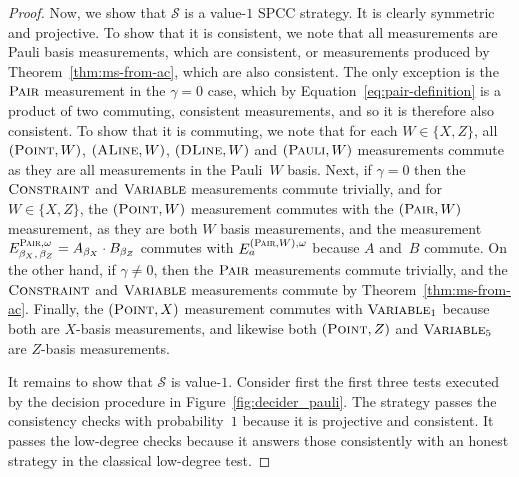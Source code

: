 \documentclass[11pt]{article}
\theoremstyle{definition}
\newcommand{\strategy}{\mathscr{S}}
\newcommand{\typestyle}[1]{\ensuremath{\textsc{#1}}\xspace}
\newcommand{\Point}{\typestyle{Point}}
\newcommand{\ALine}{\typestyle{ALine}}
\newcommand{\DLine}{\typestyle{DLine}}
\newcommand{\Pair}{\typestyle{Pair}}
\newcommand{\Constraint}{\typestyle{Constraint}}
\newcommand{\Variable}{\typestyle{Variable}}
\newcommand{\Pauli}{\typestyle{Pauli}}
\begin{document}
\begin{proof}
  Now, we show that $\strategy$ is a value-$1$ SPCC strategy.
  It is clearly symmetric and projective. 
  To show that it is consistent, we note that all measurements are Pauli basis
  measurements, which are consistent, or measurements produced by
  Theorem~\ref{thm:ms-from-ac}, which are also consistent.
  The only exception is the $\Pair$ measurement in the $\gamma = 0$ case, which
  by Equation~\eqref{eq:pair-definition} is a product of two commuting,
  consistent measurements, and so it is therefore also consistent.
  To show that it is commuting, we note that for each $W \in \{X, Z\}$, all
  $(\Point, W)$, $(\ALine, W)$, $(\DLine,W)$ and $(\Pauli, W)$ measurements
  commute as they are all measurements in the Pauli~$W$ basis.
  Next, if $\gamma = 0$ then the $\Constraint$ and $\Variable$ measurements
  commute trivially, and for $W \in \{X, Z\}$, the $(\Point, W)$ measurement
  commutes with the $(\Pair, W)$ measurement, as they are both $W$ basis
  measurements, and the measurement $E^{\Pair, \omega}_{\beta_X, \, \beta_Z} =
  A_{\beta_X}\cdot B_{\beta_Z}$ commutes with $E^{(\Pair, W), \omega}_{a}$
  because $A$ and~$B$ commute.
  On the other hand, if $\gamma \neq 0$, then the $\Pair$ measurements commute
  trivially, and the $\Constraint$ and $\Variable$ measurements commute by
  Theorem~\ref{thm:ms-from-ac}.
  Finally, the $(\Point, X)$ measurement commutes with $\Variable_1$ because
  both are $X$-basis measurements, and likewise both $(\Point, Z)$ and
  $\Variable_5$ are $Z$-basis measurements.
  
  It remains to show that $\strategy$ is value-$1$.
	Consider first the first three tests executed by the decision procedure in
  Figure~\ref{fig:decider_pauli}.
  The strategy passes the consistency checks with probability~$1$ because it is
  projective and consistent.
  It passes the low-degree checks because it answers those consistently with an
  honest strategy in the classical low-degree test.
		

\end{proof}
\end{document}
